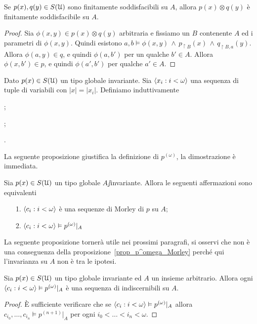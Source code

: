 \begin{proposition}
Se $p(x),q(y)\in S(\EuScript U)$ sono finitamente soddisfacibili su $A$, allora $p(x)\otimes q(y)$ \`e finitamente soddisfacibile su $A$.
\end{proposition}

\begin{proof}
Sia $\phi(x,y)\in p(x)\otimes q(y)$ arbitraria e fissiamo un $B$ contenente $A$ ed i parametri di $\phi(x,y)$. Quindi esistono $a,b\models\phi(x,y)\,\wedge\,p_{\restriction B}(x)\,\wedge\,q_{\restriction B,a}(y)$. Allora $\phi(a,y)\in q$, e quindi $\phi(a,b')$ per un qualche $b'\in A$. Allora $\phi(x,b')\in p$, e quindi $\phi(a',b')$ per qualche $a'\in A$.
\end{proof}


Dato $p(x)\in S(\EuScript U)$ un tipo globale invariante. Sia $\langle x_i:i<\omega\rangle$ una sequenza di tuple di variabili con $|x|=|x_i|$. Definiamo induttivamente

; 

;

.

La seguente proposizione giustifica la definizione di $p^{(\omega)}$, la dimostrazione \`e immediata.

\begin{proposition}\label{prop_p^omega_Morley}
Sia $p(x)\in S(\EuScript U)$ un tipo globale $A\jj$invariante. Allora le seguenti affermazioni sono equivalenti
\begin{itemize}
\item[1.]$\langle c_i:i<\omega\rangle$ \`e una sequenze di Morley di $p$ su $A$;
\item[2.] $\langle c_i:i<\omega\rangle\vDash p^{(\omega)}|_A$
\end{itemize}
\end{proposition}

La seguente proposizione torner\`a utile nei prossimi paragrafi, si osservi che  non \`e una conseguenza della proposizione~\ref{prop_p^omega_Morley} perch\'e qui l'invarianza su $A$ non \`e tra le ipotesi.

\begin{proposition}
Sia $p(x)\in S(\EuScript U)$ un tipo globale invariante ed $A$ un insieme arbitrario. Allora ogni $\langle c_i:i<\omega\rangle\vDash p^{(\omega)}|_A$ \`e una sequenza di indiscernibili su $A$.
\end{proposition}


\begin{proof}
\`E sufficiente verificare che se $\langle c_i:i<\omega\rangle\vDash p^{(\omega)}|_A$ allora $c_{i_0},\dots,c_{i_n}\models p^{(n+1)}|_A$ per ogni $i_0<\dots<i_n<\omega$. 
\end{proof}



